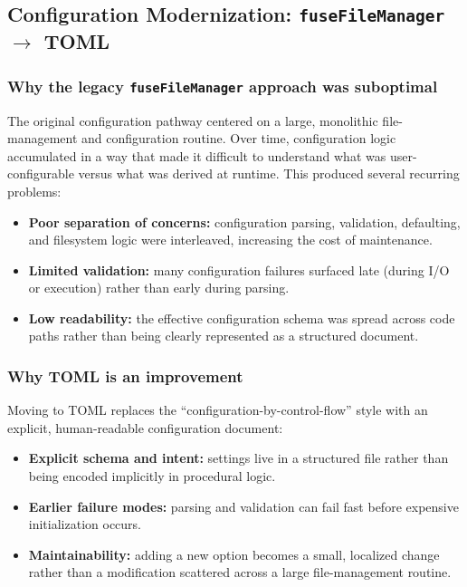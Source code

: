 \documentclass[11pt]{scrartcl}
\begin{document}
\subsection{Configuration Modernization: \texttt{fuseFileManager} $\rightarrow$ TOML}

\subsubsection{Why the legacy \texttt{fuseFileManager} approach was suboptimal}

The original configuration pathway centered on a large, monolithic file-management and
configuration routine. Over time, configuration logic accumulated in a way that made it
difficult to understand what was user-configurable versus what was derived at runtime.
This produced several recurring problems:

\begin{itemize}
\item \textbf{Poor separation of concerns:} configuration parsing, validation, defaulting,
      and filesystem logic were interleaved, increasing the cost of maintenance.
\item \textbf{Limited validation:} many configuration failures surfaced late (during I/O
      or execution) rather than early during parsing.
\item \textbf{Low readability:} the effective configuration schema was spread across code paths
      rather than being clearly represented as a structured document.
\end{itemize}

\subsubsection{Why TOML is an improvement}

Moving to TOML replaces the ``configuration-by-control-flow'' style with an explicit,
human-readable configuration document:

\begin{itemize}
\item \textbf{Explicit schema and intent:} settings live in a structured file rather than
      being encoded implicitly in procedural logic.
\item \textbf{Earlier failure modes:} parsing and validation can fail fast before expensive
      initialization occurs.
\item \textbf{Maintainability:} adding a new option becomes a small, localized change rather
      than a modification scattered across a large file-management routine.
\end{itemize}
\end{document}
